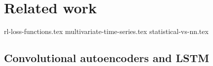 
\chapter{Related work}\label{RelatedWorkMain}

{rl-loss-functions.tex}
{multivariate-time-series.tex}
{statistical-vs-nn.tex}
\section{Convolutional autoencoders and LSTM}
